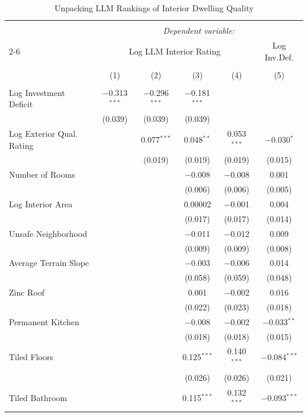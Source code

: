 
\begin{table}[H] \centering 
  \caption{Unpacking LLM Rankings of Interior Dwelling Quality} 
  \label{reg_TABLE2} 
\scriptsize 
\begin{tabular}{@{\extracolsep{-7pt}}lccccc} 
\\[-1.8ex]\hline 
\hline \\[-1.8ex] 
 & \multicolumn{5}{c}{\textit{Dependent variable:}} \\ 
\cline{2-6} 
 & \multicolumn{4}{c}{Log LLM Interior Rating} & Log Inv.Def. \\ 
\\[-1.8ex] & (1) & (2) & (3) & (4) & (5)\\ 
\hline \\[-1.8ex] 
 Log Investment Deficit & $-$0.313$^{***}$ & $-$0.296$^{***}$ & $-$0.181$^{***}$ &  &  \\ 
  & (0.039) & (0.039) & (0.039) &  &  \\ 
  Log Exterior Qual. Rating &  & 0.077$^{***}$ & 0.048$^{**}$ & 0.053$^{***}$ & $-$0.030$^{*}$ \\ 
  &  & (0.019) & (0.019) & (0.019) & (0.015) \\ 
  Number of Rooms &  &  & $-$0.008 & $-$0.008 & 0.001 \\ 
  &  &  & (0.006) & (0.006) & (0.005) \\ 
  Log Interior Area &  &  & 0.00002 & $-$0.001 & 0.004 \\ 
  &  &  & (0.017) & (0.017) & (0.014) \\ 
  Unsafe Neighborhood &  &  & $-$0.011 & $-$0.012 & 0.009 \\ 
  &  &  & (0.009) & (0.009) & (0.008) \\ 
  Average Terrain Slope &  &  & $-$0.003 & $-$0.006 & 0.014 \\ 
  &  &  & (0.058) & (0.059) & (0.048) \\ 
  Zinc Roof &  &  & 0.001 & $-$0.002 & 0.016 \\ 
  &  &  & (0.022) & (0.023) & (0.018) \\ 
  Permanent Kitchen &  &  & $-$0.008 & $-$0.002 & $-$0.033$^{**}$ \\ 
  &  &  & (0.018) & (0.018) & (0.015) \\ 
  Tiled Floors &  &  & 0.125$^{***}$ & 0.140$^{***}$ & $-$0.084$^{***}$ \\ 
  &  &  & (0.026) & (0.026) & (0.021) \\ 
  Tiled Bathroom &  &  & 0.115$^{***}$ & 0.132$^{***}$ & $-$0.093$^{***}$ \\ 

\end{tabular}
\end{table}
